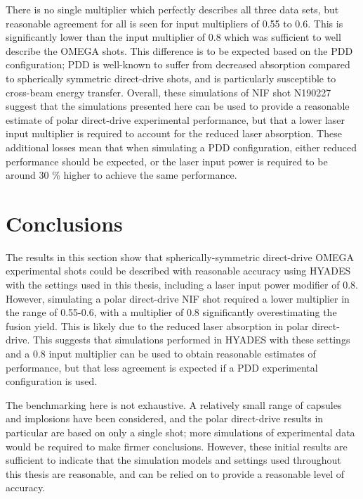 There is no single multiplier which perfectly describes all three data sets, but reasonable agreement for all is seen for input multipliers of 0.55 to 0.6. This is significantly lower than the input multiplier of 0.8 which was sufficient to well describe the OMEGA shots. This difference is to be expected based on the PDD configuration; PDD is well-known to suffer from decreased absorption compared to spherically symmetric direct-drive shots, and is particularly susceptible to cross-beam energy transfer. Overall, these simulations of NIF shot N190227 suggest that the simulations presented here can be used to provide a reasonable estimate of polar direct-drive experimental performance, but that a lower laser input multiplier is required to account for the reduced laser absorption. These additional losses mean that when simulating a PDD configuration, either reduced performance should be expected, or the laser input power is required to be around 30 \% higher to achieve the same performance. 

\section{Conclusions}

The results in this section show that spherically-symmetric direct-drive OMEGA experimental shots could be described with reasonable accuracy using HYADES with the settings used in this thesis, including a laser input power modifier of 0.8. However, simulating a polar direct-drive NIF shot required a lower multiplier in the range of 0.55-0.6, with a multiplier of 0.8 significantly overestimating the fusion yield. This is likely due to the reduced laser absorption in polar direct-drive. This suggests that simulations performed in HYADES with these settings and a 0.8 input multiplier can be used to obtain reasonable estimates of performance, but that less agreement is expected if a PDD experimental configuration is used.

The benchmarking here is not exhaustive. A relatively small range of capsules and implosions have been considered, and the polar direct-drive results in particular are based on only a single shot; more simulations of experimental data would be required to make firmer conclusions. However, these initial results are sufficient to indicate that the simulation models and settings used throughout this thesis are reasonable, and can be relied on to provide a reasonable level of accuracy.

